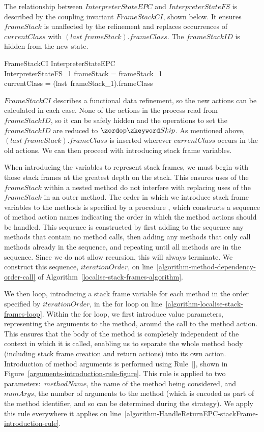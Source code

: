 The relationship between $InterpreterStateEPC$ and
$InterpreterStateFS$ is described by the coupling invariant
$FrameStackCI$, shown below.
It ensures $frameStack$ is unaffected by the refinement and replaces
occurrences of $currentClass$ with $(last~frameStack).frameClass$.
The $frameStackID$ is hidden from the new state.
\begin{schema}{FrameStackCI}
  InterpreterStateEPC \\
  InterpreterStateFS_1
\where
  frameStack = frameStack_1 \\
  currentClass = (last~frameStack_1).frameClass
\end{schema}

$FrameStackCI$ describes a functional data refinement, so the new
actions can be calculated in each case.
None of the actions in the process read from $frameStackID$, so it can
be safely hidden and the operations to set the $frameStackID$ are
reduced to $\Skip$.
As mentioned above, $(last~frameStack).frameClass$ is inserted
wherever $currentClass$ occurs in the old actions.
We can then proceed with introducing stack frame variables.

When introducing the variables to represent stack frames, we must
begin with those stack frames at the greatest depth on the stack.
This ensures uses of the $frameStack$ within a nested method do not
interfere with replacing uses of the $frameStack$ in an outer method.
The order in which we introduce stack frame variables to the methods
is specified by a procedure , which
constructs a sequence of method action names indicating the order in
which the method actions should be handled.
This sequence is constructed by first adding to the sequence any
methods that contain no method calls, then adding any methods that
only call methods already in the sequence, and repeating until all
methods are in the sequence.
Since we do not allow recursion, this will always terminate.
We construct this sequence, $iterationOrder$, on
line~\ref{algorithm-method-dependency-order-call} of
Algorithm~\ref{localise-stack-frames-algorithm}.

We then loop, introducing a stack frame variable for each method in
the order specified by $iterationOrder$, in the for loop on
line~\ref{algorithm-localise-stack-frames-loop}.
Within the for loop, we first introduce value parameters, representing
the arguments to the method, around the call to the method action.
This ensures that the body of the method is completely independent of
the context in which it is called, enabling us to separate the whole
method body (including stack frame creation and return actions) into
its own action.
Introduction of method arguments is performed using
Rule~[], shown in
Figure~\ref{arguments-introduction-rule-figure}.
This rule is applied to two parameters:~$methodName$, the name of the
method being considered, and $numArgs$, the number of arguments to the
method (which is encoded as part of the method identifier, and so can
be determined during the strategy).
We apply this rule everywhere it applies on
line~\ref{algorithm-HandleReturnEPC-stackFrame-introduction-rule}.

